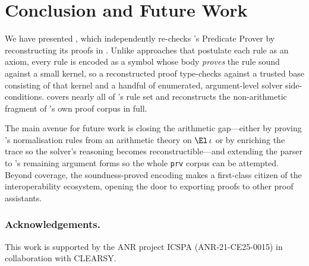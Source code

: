 \section{Conclusion and Future Work}\label{sec:conclusion}

We have presented \tool, which independently re-checks \ab's Predicate
Prover by reconstructing its proofs in \lp. Unlike approaches that
postulate each rule as an axiom, every \pp{} rule is encoded as a symbol
whose body \emph{proves} the rule sound against a small \bbook{} kernel,
so a reconstructed proof type-checks against a trusted base consisting of
that kernel and a handful of enumerated, argument-level solver
side-conditions. \tool{} covers nearly all of \pp's rule set and
reconstructs the non-arithmetic fragment of \ab's own proof corpus in
full.

The main avenue for future work is closing the arithmetic gap---either by
proving \pp's normalisation rules from an arithmetic theory on
\(\El\,\iota\) or by enriching the trace so the solver's reasoning becomes
reconstructible---and extending the parser to \pp's remaining argument
forms so the whole \texttt{prv} corpus can be attempted. Beyond coverage,
the soundness-proved encoding makes \pp{} a first-class citizen of the
\dedukti{} interoperability ecosystem, opening the door to exporting
\ab{} proofs to other proof assistants.

\subsubsection*{Acknowledgements.}
This work is supported by the ANR project ICSPA
(ANR-21-CE25-0015) in collaboration with CLEARSY.

